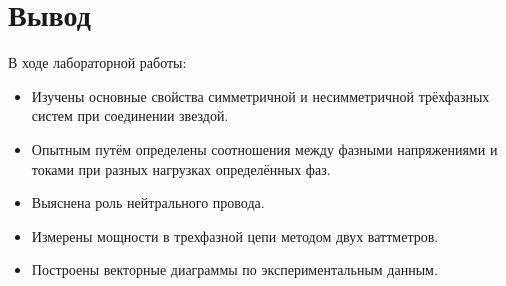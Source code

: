 \section{Вывод}
В ходе лабораторной работы:
\begin{itemize}
\item Изучены основные свойства симметричной и несимметричной трёхфазных систем при соединении звездой.
\item Опытным путём определены соотношения между фазными напряжениями и токами при разных нагрузках определённых фаз.
\item Выяснена роль нейтрального провода.
\item Измерены мощности в трехфазной цепи методом двух ваттметров.
\item Построены векторные диаграммы по экспериментальным данным.

\end{itemize}
\clearpage
